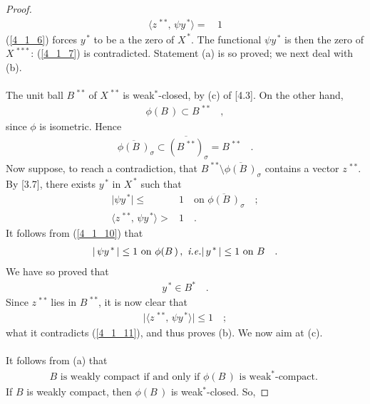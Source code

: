 \begin{proof}
\begin{align}
\label{4_1_7} \langle z^{\,\ast\ast},\, \psi y^{\,\ast} \rangle=&\,1
\end{align}
(\ref{4_1_6}) forces $y^{\,\ast}$ to be a the zero of $X^{\,\ast}$. The functional $\psi y^{\,\ast}$ is then the zero of $X^{\,\ast\ast\ast}$: (\ref{4_1_7}) is contradicted. Statement (a) is so proved; we next deal with (b).\\
\\
The unit ball $B^{\,\ast\ast}$ of $X^{\,\ast\ast}$ is weak$^\ast$-closed, by (c) of [4.3]. On the other hand,
\begin{align}
\phi(B\,)\subset  B^{\,\ast\ast}\quad ,
\end{align}
since $\phi$ is isometric. Hence
\begin{align}
\overline{\phi(B\,)}_\sigma\subset \overline{ (B^{\,\ast\ast})}_\sigma=  B^{\,\ast\ast}\quad .
\end{align}
Now suppose, to reach a contradiction, that $B^{\,\ast\ast}\setminus \overline{\phi(B\,)}_\sigma$ contains a vector $z^{\,\ast\ast}$. By [3.7], there exists $y^{\,\ast}$ in $X^{\,\ast}$ such that 
\begin{align}
 \label{4_1_10} \lvert \psi y^{\,\ast}  \rvert \leq &1 \quad  \text{on}\,\,\overline{\phi(B\,)}_\sigma \quad  ; \\
   \label{4_1_11}  \langle z^{\,\ast\ast},\, \psi y^{\,\ast} \rangle > &1\quad .
\end{align}
It follows from (\ref{4_1_10}) that 
\begin{align}
\lvert \, \psi y^{\,\ast}\,   \rvert \leq 1 \text{  on }\phi(B\,)\, , \, \, \textit{i.e.} \lvert\, y^{\,\ast}  \, \rvert \leq 1  \text{  on } B\quad .
\end{align}
We have so proved that 
\begin{align}
y^{\,\ast} \in B^\ast \quad .
\end{align}
Since $ z^{\,\ast\ast}$ lies in $B^{\,\ast\ast}$, it is now clear that 
\begin{align}
\lvert \langle z^{\,\ast\ast},\,  \psi y^{\,\ast} \rangle\rvert \leq 1\quad; 
\end{align}
what it contradicts (\ref{4_1_11}), and thus proves (b). We now aim at (c).\\
\\
It follows from (a) that
\begin{align}\label{4_15}
B\text{ is weakly compact if and only if }\phi(B\,) \text{ is weak}^\ast\text{-compact. }
\end{align}
If $B$ is weakly compact, then $\phi(B\,)$ is weak$^\ast$-closed. So,

\end{proof}
